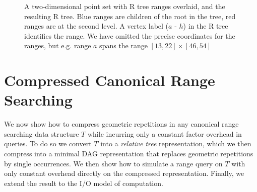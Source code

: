 \begin{figure}[tb]
	\begin{center}
	\quad\quad\quad\quad{}
	\caption{A two-dimensional point set with R tree ranges overlaid, and the resulting R tree. Blue ranges are children of the root in the tree, red ranges are at the second level. A vertex label ($a$ - $h$) in the R tree identifies the range. We have omitted the precise coordinates for the ranges, but e.g. range $a$ spans the range $[13, 22] \times [46, 54]$ \label{fig:r-rep}}
	\end{center}
\end{figure} 

\section{Compressed Canonical Range Searching}\label{sec:compcrs}
We now show how to compress geometric repetitions in any canonical range searching data structure $T$ while incurring only a constant factor overhead in queries. To do so we convert $T$ into a \emph{relative tree} representation, which we then compress into a minimal DAG representation that replaces geometric repetitions by single occurrences. We then show how to simulate a range query on $T$ with only constant overhead directly on the compressed representation. Finally, we extend the result to the I/O model of computation.

